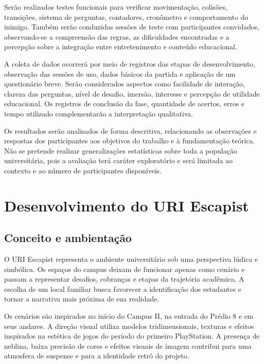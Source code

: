 \documentclass[12pt]{article}
\begin{document}
Serão realizados testes funcionais para verificar movimentação, colisões, transições, sistema de perguntas, contadores, cronômetro e comportamento do inimigo. Também serão conduzidas sessões de teste com participantes convidados, observando-se a compreensão das regras, as dificuldades encontradas e a percepção sobre a integração entre entretenimento e conteúdo educacional.

A coleta de dados ocorrerá por meio de registros das etapas de desenvolvimento, observação das sessões de uso, dados básicos da partida e aplicação de um questionário breve. Serão considerados aspectos como facilidade de interação, clareza das perguntas, nível de desafio, imersão, interesse e percepção de utilidade educacional. Os registros de conclusão da fase, quantidade de acertos, erros e tempo utilizado complementarão a interpretação qualitativa.

Os resultados serão analisados de forma descritiva, relacionando as observações e respostas dos participantes aos objetivos do trabalho e à fundamentação teórica. Não se pretende realizar generalizações estatísticas sobre toda a população universitária, pois a avaliação terá caráter exploratório e será limitada ao contexto e ao número de participantes disponíveis.

\section{Desenvolvimento do URI Escapist}

\subsection{Conceito e ambientação}

O URI Escapist representa o ambiente universitário sob uma perspectiva lúdica e simbólica. Os espaços do campus deixam de funcionar apenas como cenário e passam a representar desafios, cobranças e etapas da trajetória acadêmica. A escolha de um local familiar busca favorecer a identificação dos estudantes e tornar a narrativa mais próxima de sua realidade.

Os cenários são inspirados no início do Campus II, na entrada do Prédio 8 e em seus andares. A direção visual utiliza modelos tridimensionais, texturas e efeitos inspirados na estética de jogos do período do primeiro PlayStation. A presença de neblina, baixa precisão de cores e efeitos visuais de imagem contribui para uma atmosfera de suspense e para a identidade retrô do projeto.
\end{document}
